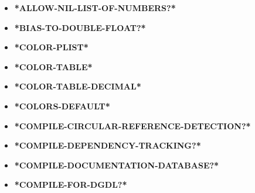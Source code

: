 \documentclass [11pt]{book}
\begin{document}
\begin{itemize}

\item {}
\label{prim:*allow-nil-list-of-numbers?*}
\textbf{*ALLOW-NIL-LIST-OF-NUMBERS?*}





\item {}
\label{prim:*bias-to-double-float?*}
\textbf{*BIAS-TO-DOUBLE-FLOAT?*}





\item {}
\label{prim:*color-plist*}
\textbf{*COLOR-PLIST*}





\item {}
\label{prim:*color-table*}
\textbf{*COLOR-TABLE*}





\item {}
\label{prim:*color-table-decimal*}
\textbf{*COLOR-TABLE-DECIMAL*}





\item {}
\label{prim:*colors-default*}
\textbf{*COLORS-DEFAULT*}





\item {}
\label{prim:*compile-circular-reference-detection?*}
\textbf{*COMPILE-CIRCULAR-REFERENCE-DETECTION?*}





\item {}
\label{prim:*compile-dependency-tracking?*}
\textbf{*COMPILE-DEPENDENCY-TRACKING?*}





\item {}
\label{prim:*compile-documentation-database?*}
\textbf{*COMPILE-DOCUMENTATION-DATABASE?*}





\item {}
\label{prim:*compile-for-dgdl?*}
\textbf{*COMPILE-FOR-DGDL?*}






\end{itemize}
\end{document}
